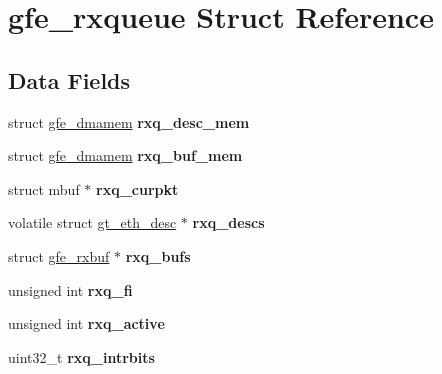 \hypertarget{structgfe__rxqueue}{}\section{gfe\+\_\+rxqueue Struct Reference}
\label{structgfe__rxqueue}
\subsection*{Data Fields}
\begin{DoxyCompactItemize}
\item 
\mbox{\label{structgfe__rxqueue_a1763fa002610b7551fa752a19b08fd63}} 
struct \mbox{\hyperlink{structgfe__dmamem}{gfe\+\_\+dmamem}} {\bfseries rxq\+\_\+desc\+\_\+mem}
\item 
\mbox{\label{structgfe__rxqueue_a856c169bdcbedc5a1a967ec45af07e42}} 
struct \mbox{\hyperlink{structgfe__dmamem}{gfe\+\_\+dmamem}} {\bfseries rxq\+\_\+buf\+\_\+mem}
\item 
\mbox{\label{structgfe__rxqueue_ad1fff66e9d641967654ebb1588ae450f}} 
struct mbuf $\ast$ {\bfseries rxq\+\_\+curpkt}
\item 
\mbox{\label{structgfe__rxqueue_a0352a36f79daa84abea6b937170409aa}} 
volatile struct \mbox{\hyperlink{structgt__eth__desc}{gt\+\_\+eth\+\_\+desc}} $\ast$ {\bfseries rxq\+\_\+descs}
\item 
\mbox{\label{structgfe__rxqueue_a9a90c721736254950c29c2b5e79e61ea}} 
struct \mbox{\hyperlink{structgfe__rxbuf}{gfe\+\_\+rxbuf}} $\ast$ {\bfseries rxq\+\_\+bufs}
\item 
\mbox{\label{structgfe__rxqueue_af0e70d5403bc06632d7ff65e783dd729}} 
unsigned int {\bfseries rxq\+\_\+fi}
\item 
\mbox{\label{structgfe__rxqueue_a755abb22762b2e4028a1f50f1f39c27b}} 
unsigned int {\bfseries rxq\+\_\+active}
\item 
\mbox{\label{structgfe__rxqueue_a59578479480c89c87b43cf3e8ab0f1f2}} 
uint32\+\_\+t {\bfseries rxq\+\_\+intrbits}
\item 

\end{DoxyCompactItemize}
